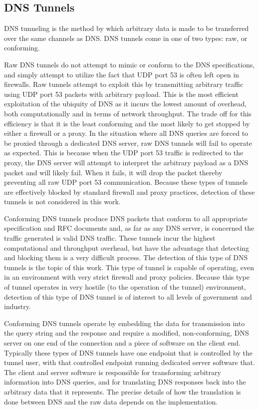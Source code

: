 \documentclass{article}
\theoremstyle{remark}
\theoremstyle{definition}
\theoremstyle{definition}
\theoremstyle{definition}
\begin{document}
\subsection{DNS Tunnels}
\label{dnstunnels.types}

DNS tunneling is the method by which arbitrary data is made to be transferred
over the same channels as DNS. DNS tunnels come in one of two types: raw, or
conforming.

\label{dnstunnels.types.raw}
Raw DNS tunnels do not attempt to mimic or conform to the DNS
specifications, and simply attempt to utilize the fact that UDP port 53 is
often left open in firewalls. Raw tunnels attempt to exploit this by
transmitting arbitrary traffic using UDP port 53 packets with arbitrary payload.
This is the most efficient exploitation of the ubiquity of DNS as it incurs the
lowest amount of overhead, both computationally and in terms of network
throughput. The trade off for this efficiency is that it is the least
conforming and the most likely to get stopped by either a firewall or a proxy.
In the situation where all DNS queries are forced to be proxied through a
dedicated DNS server, raw DNS tunnels will fail to operate as expected. This is
because when the UDP port 53 traffic is redirected to the proxy, the DNS server
will attempt to interpret the arbitrary payload as a DNS packet and will likely
fail. When it fails, it will drop the packet thereby preventing all raw UDP
port 53 communication. Because these types of tunnels are effectively blocked by
standard firewall and proxy practices, detection of these tunnels is not
considered in this work.

\label{dnstunnels.types.conforming}
Conforming DNS tunnels produce DNS packets that conform to all appropriate
specification and RFC documents and, as far as any DNS server, is concerned the
traffic generated is valid DNS traffic. These tunnels incur the highest
computational and throughput overhead, but have the advantage that detecting
and blocking them is a very difficult process. The detection of this type of
DNS tunnels is the topic of this work. This type of tunnel is capable of
operating, even in an environment with very strict firewall and proxy policies.
Because this type of tunnel operates in very hostile (to the operation of the
tunnel) environment, detection of this type of DNS tunnel is of interest to all
levels of government and industry.

Conforming DNS tunnels operate by embedding the data for transmission into the
query string and the response and require a modified, non-conforming, DNS
server on one end of the connection and a piece of software on the client end.
Typically these types of DNS tunnels have one endpoint that is controlled by the
tunnel user, with that controlled endpoint running dedicated server software
that. The client and server software is responsible for transforming arbitrary
information into DNS queries, and for translating DNS responses back into the
arbitrary data that it represents. The precise details of how the translation
is done between DNS and the raw data depends on the implementation.
\end{document}

